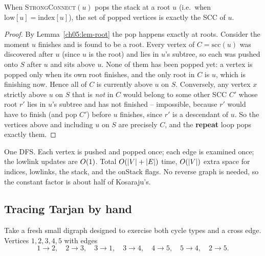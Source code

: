\begin{theorem}
\label{ch05:thm-tarjan}
When \textsc{StrongConnect}$(u)$ pops the stack at a root $u$ (i.e.\ when $\mathrm{low}[u]=\mathrm{index}[u]$), the set of popped vertices is exactly the SCC of $u$.
\end{theorem}

\begin{proof}
By Lemma~\ref{ch05:lem-root} the pop happens exactly at roots. Consider the moment $u$ finishes and is found to be a root. Every vertex of $C=\mathrm{scc}(u)$ was discovered after $u$ (since $u$ is the root) and lies in $u$'s subtree, so each was pushed onto $S$ after $u$ and sits above $u$. None of them has been popped yet: a vertex is popped only when its own root finishes, and the only root in $C$ is $u$, which is finishing now. Hence all of $C$ is currently above $u$ on $S$. Conversely, any vertex $x$ strictly above $u$ on $S$ that is \emph{not} in $C$ would belong to some other SCC $C'$ whose root $r'$ lies in $u$'s subtree and has not finished -- impossible, because $r'$ would have to finish (and pop $C'$) before $u$ finishes, since $r'$ is a descendant of $u$. So the vertices above and including $u$ on $S$ are precisely $C$, and the \textbf{repeat} loop pops exactly them.
\end{proof}

\begin{complexitybox}
One DFS. Each vertex is pushed and popped once; each edge is examined once; the lowlink updates are $O(1)$. Total $O(\lvert V\rvert+\lvert E\rvert)$ time, $O(\lvert V\rvert)$ extra space for indices, lowlinks, the stack, and the onStack flags. No reverse graph is needed, so the constant factor is about half of Kosaraju's.
\end{complexitybox}

\subsection{Tracing Tarjan by hand}

Take a fresh small digraph designed to exercise both cycle types and a cross edge. Vertices $1,2,3,4,5$ with edges
\[
1\to 2,\quad 2\to 3,\quad 3\to 1,\quad 3\to 4,\quad 4\to 5,\quad 5\to 4,\quad 2\to 5.
\]

\begin{center}
\end{center}

